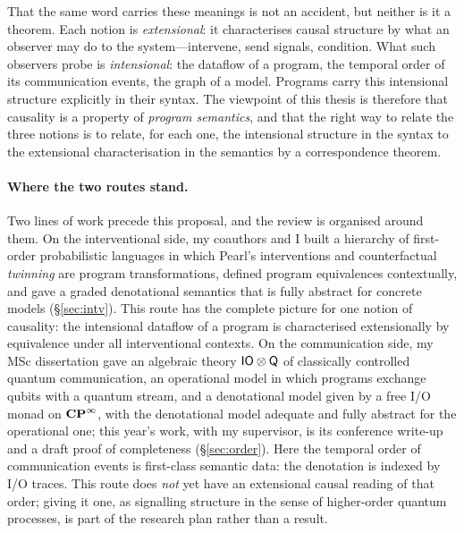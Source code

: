 That the same word carries these meanings is not an accident, but neither is it a theorem. Each notion is \emph{extensional}: it characterises causal structure by what an observer may do to the system---intervene, send signals, condition. What such observers probe is \emph{intensional}: the dataflow of a program, the temporal order of its communication events, the graph of a model. Programs carry this intensional structure explicitly in their syntax. The viewpoint of this thesis is therefore that causality is a property of \emph{program semantics}, and that the right way to relate the three notions is to relate, for each one, the intensional structure in the syntax to the extensional characterisation in the semantics by a correspondence theorem.

\paragraph{Where the two routes stand.}
Two lines of work precede this proposal, and the review is organised around them. On the interventional side, my coauthors and I built a hierarchy of first-order probabilistic languages in which Pearl's interventions and counterfactual \emph{twinning} are program transformations, defined program equivalences contextually, and gave a graded denotational semantics that is fully abstract for concrete models (\S\ref{sec:intv}). This route has the complete picture for one notion of causality: the intensional dataflow of a program is characterised extensionally by equivalence under all interventional contexts. On the communication side, my MSc dissertation gave an algebraic theory $\mathsf{IO}\otimes\mathsf{Q}$ of classically controlled quantum communication, an operational model in which programs exchange qubits with a quantum stream, and a denotational model given by a free I/O monad on $\mathbf{CP}^{\infty}$, with the denotational model adequate and fully abstract for the operational one; this year's work, with my supervisor, is its conference write-up and a draft proof of completeness (\S\ref{sec:order}). Here the temporal order of communication events is first-class semantic data: the denotation is indexed by I/O traces. This route does \emph{not} yet have an extensional causal reading of that order; giving it one, as signalling structure in the sense of higher-order quantum processes, is part of the research plan rather than a result.

